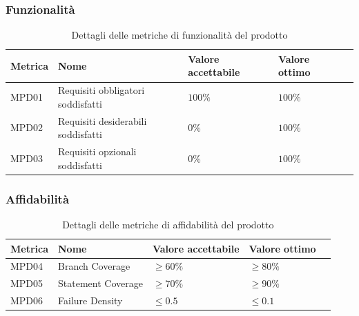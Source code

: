 \documentclass[a4paper,12pt]{article}
\begin{document}
{{        \subsubsection{Funzionalità}
         \leavevmode
                \begin{table}[H]
                \centering
                    \begin{tabular}{|l|l|l|l|l|}
                        \hline
                        \rowcolor{gold}
                        \textbf{Metrica} & \textbf{Nome} & \textbf{Valore accettabile} & \textbf{Valore ottimo} \\
                        \hline
                        MPD01 & Requisiti obbligatori soddisfatti & $100\%$ & $100\%$ \\
                        \hline
                        MPD02 & Requisiti desiderabili soddisfatti & $0\%$ & $100\%$ \\
                        \hline
                        MPD03 & Requisiti opzionali soddisfatti & $0\%$ & $100\%$ \\
                        \hline
                    \end{tabular}
                    \caption{Dettagli delle metriche di funzionalità del prodotto}
                    \label{tab:metriche-funzionalità}
                \end{table}

        \subsubsection{Affidabilità}
        \leavevmode
                \begin{table}[H]
                \centering
                    \begin{tabular}{|l|l|l|l|l|}
                        \hline
                        \rowcolor{gold}
                        \textbf{Metrica} & \textbf{Nome} & \textbf{Valore accettabile} & \textbf{Valore ottimo} \\
                        \hline
                        MPD04 & Branch Coverage & $\ge 60\%$ & $\ge 80\%$ \\
                        \hline
                        MPD05 & Statement Coverage & $\ge 70\%$ & $\ge 90\%$ \\
                        \hline
                        MPD06 & Failure Density & $\le 0.5$ & $\le 0.1$ \\
                        \hline
                    \end{tabular}
                    \caption{Dettagli delle metriche di affidabilità del prodotto}
                    \label{tab:metriche-affidabilità}
                \end{table}

}}
\end{document}
